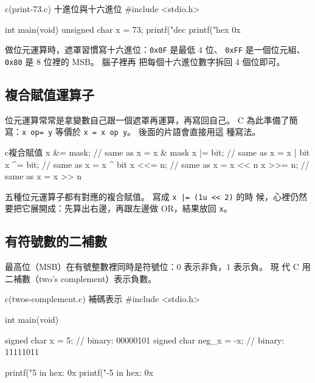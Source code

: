 \begin{example}{c}{(print-73.c) 十進位與十六進位}
#include <stdio.h>

int main(void) {
    unsigned char x = 73;
    printf("dec %
    printf("hex 0x%
}
\end{example}


做位元運算時，遮罩習慣寫十六進位：\texttt{0x0F} 是最低 $4$ 位、
\texttt{0xFF} 是一個位元組、\texttt{0x80} 是 8 位裡的 MSB。 腦子裡再
把每個十六進位數字拆回 $4$ 個位即可。

\subsection{複合賦值運算子}

位元運算常常是拿變數自己跟一個遮罩再運算，再寫回自己。 C 為此準備了簡
寫：\texttt{x op= y} 等價於 \texttt{x = x op y}。 後面的片語會直接用這
種寫法。

\begin{code}{c}{複合賦值}
x &= mask;    // same as x = x & mask
x |= bit;     // same as x = x | bit
x ^= bit;     // same as x = x ^ bit
x <<= n;      // same as x = x << n
x >>= n;      // same as x = x >> n
\end{code}

五種位元運算子都有對應的複合賦值。 寫成 \texttt{x |= (1u << 2)} 的時
候，心裡仍然要把它展開成：先算出右邊，再跟左邊做 OR，結果放回
\texttt{x}。

\subsection{有符號數的二補數}

最高位（MSB）在有號整數裡同時是符號位：$0$ 表示非負，$1$ 表示負。 現
代 C 用二補數（two's complement）表示負數。

\begin{example}{c}{(twos-complement.c) 補碼表示}
#include <stdio.h>

int main(void) {
    signed char x = 5;     // binary: 00000101
    signed char neg_x = -x; // binary: 11111011

    printf("5 in hex: 0x%
    printf("-5 in hex: 0x%
}
\end{example}


